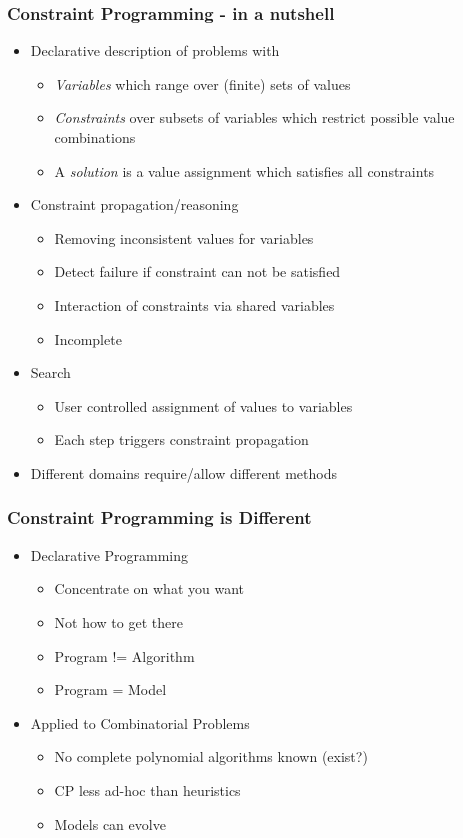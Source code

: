 \begin{frame}
\frametitle{Constraint Programming - in a nutshell}
\begin{itemize}
\item Declarative description of problems with
\begin{itemize}
\item {\em Variables} which range over (finite) sets of values
\item {\em Constraints} over subsets of variables which restrict possible value combinations
\item A {\em solution} is a value assignment which satisfies all constraints
\end{itemize}

\item Constraint propagation/reasoning
\begin{itemize}
\item Removing inconsistent values for variables
\item Detect failure if constraint can not be satisfied
\item Interaction of constraints via shared variables
\item Incomplete
\end{itemize}

\item Search
\begin{itemize}
\item User controlled assignment of values to variables
\item Each step triggers constraint propagation 
\end{itemize}
\item Different domains require/allow different methods
\end{itemize}
\end{frame}

\begin{frame}
  \frametitle{Constraint Programming is Different}
  \begin{itemize}
  \item Declarative Programming
    \begin{itemize}
    \item Concentrate on what you want
      \item Not how to get there
      \item Program != Algorithm
      \item Program = Model
    \end{itemize}
    \item Applied to Combinatorial Problems
      \begin{itemize}
        \item No complete polynomial algorithms known (exist?)
        \item CP less ad-hoc than heuristics
        \item Models can evolve
  \end{itemize}
  \end{itemize}
  \end{frame}
    
